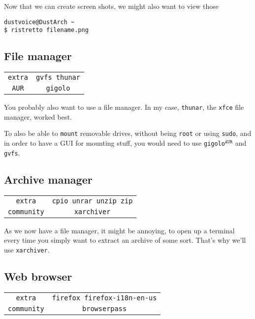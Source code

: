 \documentclass[9pt]{report}
\begin{document}
Now that we can create screen shots, we might also want to view those


\begin{verbatim}
dustvoice@DustArch ~
$ ristretto filename.png
\end{verbatim}


\vfill\eject

\hypertarget{x-file-manager}{\subsection{File manager}}
\begin{center}
\begin{tabular}{|c|c|}
\hline
\texttt{extra} & \texttt{gvfs thunar} \\ 
\texttt{AUR} & \texttt{gigolo} \\ 
\hline
\end{tabular}
\end{center}

You probably also want to use a file manager.
In my case, \texttt{thunar}, the \texttt{xfce} file manager, worked best.


To also be able to \texttt{mount} removable drives, without being \texttt{root} or using \texttt{sudo}, and in order to have a GUI for mounting stuff, you would need to use \texttt{gigolo}${}^{\texttt{AUR}}$ and \texttt{gvfs}.



\vfill\eject

\hypertarget{x-archive-manager}{\subsection{Archive manager}}
\begin{center}
\begin{tabular}{|c|c|}
\hline
\texttt{extra} & \texttt{cpio unrar unzip zip} \\ 
\texttt{community} & \texttt{xarchiver} \\ 
\hline
\end{tabular}
\end{center}

As we now have a file manager, it might be annoying, to open up a terminal every time you simply want to extract an archive of some sort.
That’s why we’ll use \texttt{xarchiver}.



\vfill\eject

\hypertarget{x-web-browser}{\subsection{Web browser}}
\begin{center}
\begin{tabular}{|c|c|}
\hline
\texttt{extra} & \texttt{firefox firefox-i18n-en-us} \\ 
\texttt{community} & \texttt{browserpass} \\ 
\hline
\end{tabular}
\end{center}
\end{document}
